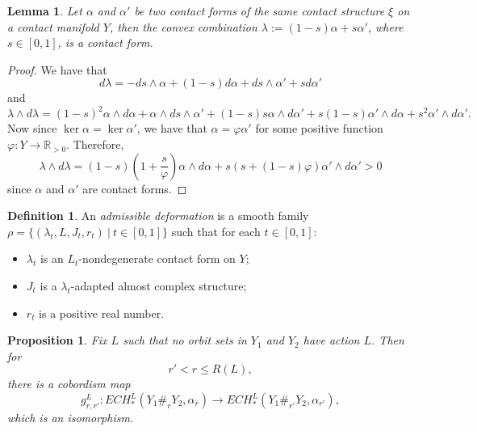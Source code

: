 \documentclass{article}
\numberwithin{equation}{section}
\newtheorem{proposition}[theorem]{Proposition}
\newtheorem{lemma}[theorem]{Lemma}
\theoremstyle{definition}
\newtheorem{definition}[theorem]{Definition}
\newcommand{\R}{\mathbb{R}}
\begin{document}
\begin{lemma}
\label{lem:convex_comb_contact}
    Let $\alpha$ and $\alpha'$ be two contact forms of the same contact structure $\xi$ on a contact manifold $Y$, then the convex combination $\lambda:=(1-s)\alpha+s\alpha'$, where $s\in [0,1]$, is a contact form.
\end{lemma}
\begin{proof}
    We have that 
    $$d\lambda = -ds\wedge \alpha + (1-s)d\alpha + ds\wedge \alpha' + sd\alpha'$$ and 
    $$\lambda \wedge d\lambda = (1-s)^2\alpha \wedge d\alpha + \alpha \wedge ds \wedge \alpha' + (1-s)s \alpha \wedge d\alpha' + s(1-s) \alpha' \wedge d\alpha + s^2 \alpha' \wedge d\alpha'.$$
    Now since $\ker \alpha = \ker \alpha'$, we have that $\alpha = \varphi \alpha'$ for some positive function $\varphi: Y \to \R_{>0}$. Therefore, 
    $$\lambda \wedge d\lambda = (1-s)(1+\frac{s}{\varphi}) \alpha \wedge d\alpha + s(s+(1-s)\varphi)\alpha' \wedge d\alpha'>0$$ 
    since $\alpha$ and $\alpha'$ are contact forms.
\end{proof}



\begin{definition}
An \emph{admissible deformation} is a smooth family $\rho = \{(\lambda_t, L, J_t, r_t) \ |\ t\in [0,1]\}$ such that for each $t\in [0,1]$:
\begin{itemize}
    \item $\lambda_t$ is an $L_t$-nondegenerate contact form on $Y$;
    \item $J_t$ is a $\lambda_t$-adapted almost complex structure;
    \item $r_t$ is a positive real number.
\end{itemize}
\end{definition}

\begin{proposition}
\label{prop:cobordism}
Fix $L$ such that no orbit sets in $Y_1$ and $Y_2$ have action $L$. Then for 
$$r'< r \leq R(L),$$ 
there is a cobordism map
\begin{equation}
g^L_{r,r'}: ECH_*^{L}(Y_1\#_{r} Y_2 , \alpha_{r}) \rightarrow ECH_*^{L}(Y_1\#_{r'} Y_2 , \alpha_{r'}),
\end{equation}
which is an isomorphism.

\end{proposition}
\end{document}
